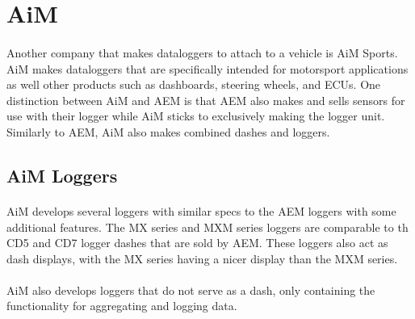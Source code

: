 \section{AiM}

\paragraph{}
Another company that makes dataloggers to attach to a vehicle is AiM Sports.
AiM makes dataloggers that are specifically intended for motorsport applications as well other products such as dashboards, steering wheels, and ECUs.
One distinction between AiM and AEM is that AEM also makes and sells sensors for use with their logger while AiM sticks to exclusively making the logger unit.
Similarly to AEM, AiM also makes combined dashes and loggers.

\subsection{AiM Loggers}

\paragraph{}
AiM develops several loggers with similar specs to the AEM loggers with some additional features.
The MX series and MXM series loggers are comparable to th CD5 and CD7 logger dashes that are sold by AEM.
These loggers also act as dash displays, with the MX series having a nicer display than the MXM series.

\paragraph{}
AiM also develops loggers that do not serve as a dash, only containing the functionality for aggregating and logging data.
